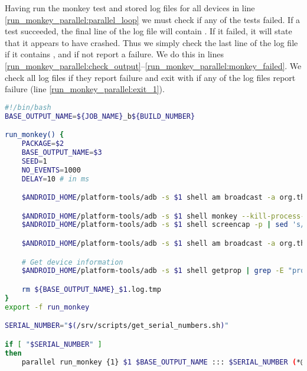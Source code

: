 Having run the monkey test and stored log files for all devices in line \ref{run_monkey_parallel:parallel_loop} we must check if any of the tests failed. If a test succeeded, the final line of the log file will contain . If it failed, it will state that it appears to have crashed. Thus we simply check the last line of the log file if it contains , and if not report a failure. We do this in lines \ref{run_monkey_parallel:check_output}--\ref{run_monkey_parallel:monkey_failed}. We check all log files if they report failure and exit with  if any of the log files report failure (line \ref{run_monkey_parallel:exit_1}).

\begin{lstlisting}[language=bash,caption=Script that runs monkey tests on all connected devices in parallel,label=lst:run_monkey_parallel]
#!/bin/bash
BASE_OUTPUT_NAME=${JOB_NAME}_b${BUILD_NUMBER}

run_monkey() {
    PACKAGE=$2
    BASE_OUTPUT_NAME=$3
    SEED=1
    NO_EVENTS=1000
    DELAY=10 # in ms

    $ANDROID_HOME/platform-tools/adb -s $1 shell am broadcast -a org.thisisafactory.simiasque.SET_OVERLAY --ez enable true (*@\label{run_monkey_parallel:go_away_monkey_true}@*)

    $ANDROID_HOME/platform-tools/adb -s $1 shell monkey --kill-process-after-error -v -v -s $SEED --throttle $DELAY -p $PACKAGE $NO_EVENTS > ${BASE_OUTPUT_NAME}_$1.log.tmp (*@\label{run_monkey_parallel:run_monkey_test}@*)
    $ANDROID_HOME/platform-tools/adb -s $1 shell screencap -p | sed 's/\r$//' > ${BASE_OUTPUT_NAME}_$1.png (*@\label{run_monkey_parallel:screenshot}@*)

    $ANDROID_HOME/platform-tools/adb -s $1 shell am broadcast -a org.thisisafactory.simiasque.SET_OVERLAY --ez enable false (*@\label{run_monkey_parallel:go_away_monkey_false}@*)

    # Get device information
    $ANDROID_HOME/platform-tools/adb -s $1 shell getprop | grep -E "product|sdk|serial" | grep -v ro.boot | cat - ${BASE_OUTPUT_NAME}_$1.log.tmp > ${BASE_OUTPUT_NAME}_$1.log (*@\label{run_monkey_parallel:device_info}@*)

    rm ${BASE_OUTPUT_NAME}_$1.log.tmp
}
export -f run_monkey

SERIAL_NUMBER="$(/srv/scripts/get_serial_numbers.sh)"

if [ "$SERIAL_NUMBER" ]
then
    parallel run_monkey {1} $1 $BASE_OUTPUT_NAME ::: $SERIAL_NUMBER (*@\label{run_monkey_parallel:parallel_loop}@*)


\end{lstlisting}
